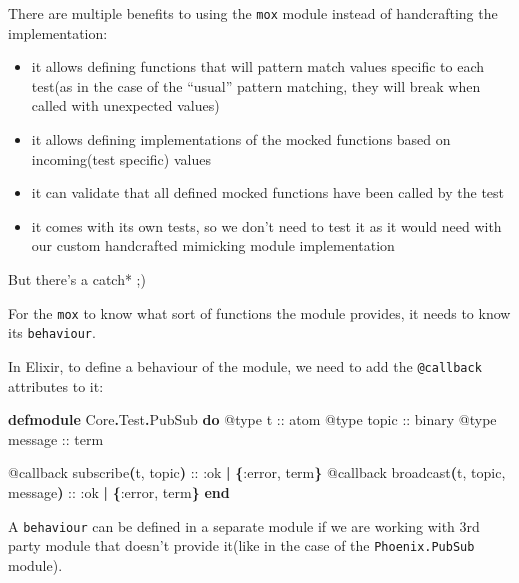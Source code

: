 \documentclass[
  oneside]{book}
\newenvironment{Shaded}{\begin{snugshade}}{\end{snugshade}}
\newcommand{\ConstantTok}[1]{\textcolor[rgb]{0.56,0.35,0.01}{#1}}
\newcommand{\FunctionTok}[1]{\textcolor[rgb]{0.13,0.29,0.53}{\textbf{#1}}}
\newcommand{\KeywordTok}[1]{\textcolor[rgb]{0.13,0.29,0.53}{\textbf{#1}}}
\newcommand{\NormalTok}[1]{#1}
\newcommand{\OperatorTok}[1]{\textcolor[rgb]{0.81,0.36,0.00}{\textbf{#1}}}
\newcommand{\OtherTok}[1]{\textcolor[rgb]{0.56,0.35,0.01}{#1}}
\newcommand{\VariableTok}[1]{\textcolor[rgb]{0.00,0.00,0.00}{#1}}
\providecommand{\tightlist}{%
  \setlength{\itemsep}{0pt}\setlength{\parskip}{0pt}}
\begin{document}
\newpage

There are multiple benefits to using the \texttt{mox} module instead of handcrafting the implementation:

\begin{itemize}
\tightlist
\item
  it allows defining functions that will pattern match values specific to each test(as in the case of the ``usual'' pattern matching, they will break when called with unexpected values)
\item
  it allows defining implementations of the mocked functions based on incoming(test specific) values
\item
  it can validate that all defined mocked functions have been called by the test
\item
  it comes with its own tests, so we don't need to test it as it would need with our custom handcrafted mimicking module implementation
\end{itemize}

But there's a catch* ;)

For the \texttt{mox} to know what sort of functions the module provides, it needs to know its \texttt{behaviour}.

In Elixir, to define a behaviour of the module, we need to add the \texttt{@callback} attributes to it:

\begin{Shaded}
\begin{Highlighting}[]
  \KeywordTok{defmodule} \ConstantTok{Core}\OperatorTok{.}\ConstantTok{Test}\OperatorTok{.}\ConstantTok{PubSub} \KeywordTok{do}
    \OtherTok{@type}\NormalTok{ t :: atom}
    \OtherTok{@type}\NormalTok{ topic :: binary}
    \OtherTok{@type}\NormalTok{ message :: term}

    \OtherTok{@callback}\NormalTok{ subscribe}\FunctionTok{(}\NormalTok{t, topic}\FunctionTok{)}\NormalTok{ :: }\VariableTok{:ok} \OperatorTok{|} \FunctionTok{\{}\VariableTok{:error}\NormalTok{, term}\FunctionTok{\}}
    \OtherTok{@callback}\NormalTok{ broadcast}\FunctionTok{(}\NormalTok{t, topic, message}\FunctionTok{)}\NormalTok{ :: }\VariableTok{:ok} \OperatorTok{|} \FunctionTok{\{}\VariableTok{:error}\NormalTok{, term}\FunctionTok{\}}
  \KeywordTok{end}
\end{Highlighting}
\end{Shaded}

A \texttt{behaviour} can be defined in a separate module if we are working with 3rd party module that doesn't provide it(like in the case of the \texttt{Phoenix.PubSub} module).
\end{document}
